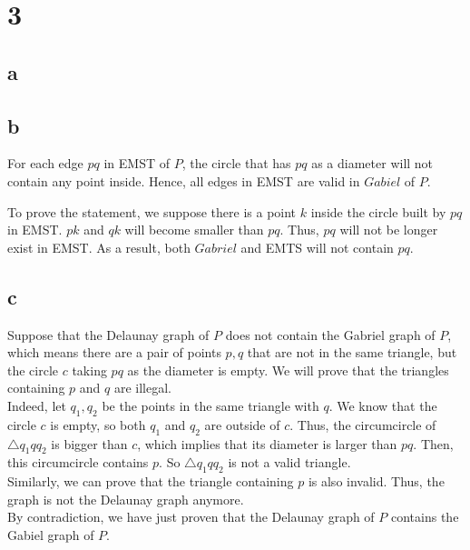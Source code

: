 \section*{3}
\subsection*{a}

\subsection*{b}
For each edge $pq$ in EMST of $P$, the circle that has $pq$ as a diameter will not contain any point inside.
Hence, all edges in EMST are valid in $Gabiel$ of $P$.

To prove the statement, we suppose there is a point $k$ inside the circle built by $pq$ in EMST.
$pk$ and $qk$ will become smaller than $pq$. Thus, $pq$ will not be longer exist in EMST.
As a result, both $Gabriel$ and EMTS will not contain $pq$.

\subsection*{c}
Suppose that the Delaunay graph of $P$ does not contain the Gabriel graph of $P$, which means there are a pair of points ${p, q}$ that are not in the same triangle, but the circle $c$ taking $pq$ as the diameter is empty. We will prove that the triangles containing $p$ and $q$ are illegal. \\

Indeed, let $q_1, q_2$ be the points in the same triangle with $q$. We know that the circle $c$ is empty, so both $q_1$ and $q_2$ are outside of $c$. Thus, the 
circumcircle of $\bigtriangleup q_1 q q_2$ is bigger than $c$, which implies that its diameter is larger than $pq$. Then, this circumcircle contains $p$. So $\bigtriangleup q_1 q q_2$ is not a valid triangle. \\

Similarly, we can prove that the triangle containing $p$ is also invalid. Thus, the graph is not the Delaunay graph anymore. \\

By contradiction, we have just proven that the Delaunay graph of $P$ contains the Gabiel graph of $P$. \\
